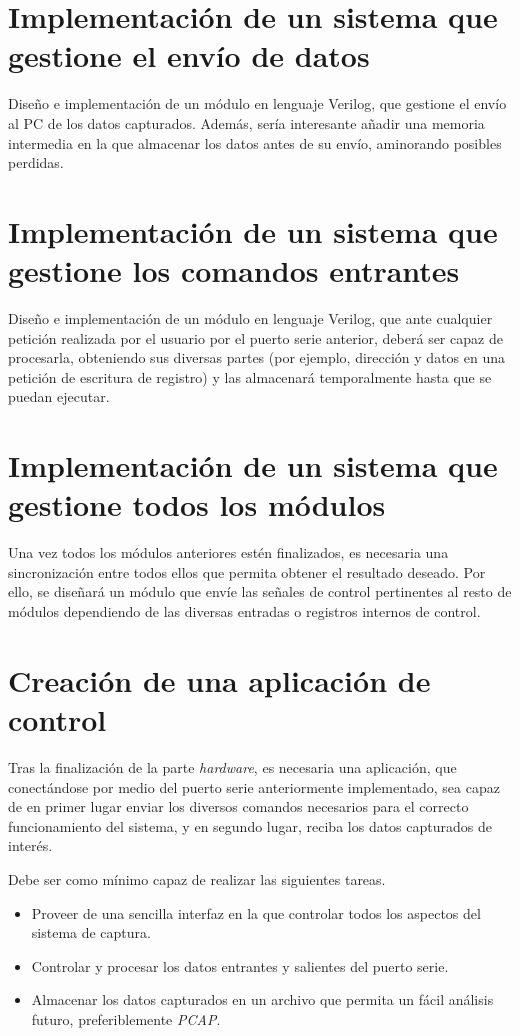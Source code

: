 \section{Implementación de un sistema que gestione el envío de datos}
Diseño e implementación de un módulo en lenguaje Verilog, que gestione el envío al PC de los datos capturados. Además, sería interesante añadir una memoria intermedia en la que almacenar los datos antes de su envío, aminorando posibles perdidas.



\section{Implementación de un sistema que gestione los comandos entrantes}
Diseño e implementación de un módulo en lenguaje Verilog, que ante cualquier petición realizada por el usuario por el puerto serie anterior, deberá ser capaz de procesarla, obteniendo sus diversas partes (por ejemplo, dirección y datos en una petición de escritura de registro) y las almacenará temporalmente hasta que se puedan ejecutar.



\section{Implementación de un sistema que gestione todos los módulos}
Una vez todos los módulos anteriores estén finalizados, es necesaria una sincronización entre todos ellos que permita obtener el resultado deseado. Por ello, se diseñará un módulo que envíe las señales de control pertinentes al resto de módulos dependiendo de las diversas entradas o registros internos de control.



\section{Creación de una aplicación de control}
Tras la finalización de la parte \emph{hardware}, es necesaria una aplicación, que conectándose por medio del puerto serie anteriormente implementado, sea capaz de en primer lugar enviar los diversos comandos necesarios para el correcto funcionamiento del sistema, y en segundo lugar, reciba los datos capturados de interés.

Debe ser como mínimo capaz de realizar las siguientes tareas.
\begin{itemize}
    \item Proveer de una sencilla interfaz en la que controlar todos los aspectos del sistema de captura.
    \item Controlar y procesar los datos entrantes y salientes del puerto serie.
    \item Almacenar los datos capturados en un archivo que permita un fácil análisis futuro, preferiblemente \emph{PCAP}\cite{tcpdump:pcap}.
\end{itemize}



